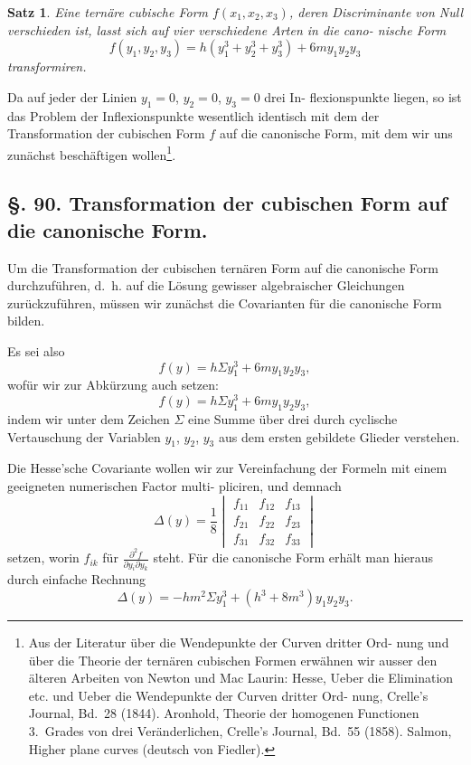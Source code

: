 \documentclass[12pt,a4paper]{article}
\theoremstyle{plain}
\newtheorem{satz}{Satz}[section]
\theoremstyle{definition}
\theoremstyle{remark}
\begin{document}
\begin{satz}
Eine ternäre cubische Form $f(x_1, x_2, x_3)$, deren
Discriminante von Null verschieden ist, lasst
sich auf vier verschiedene Arten in die cano-
nische Form
\[f(y_1, y_2, y_3) = h(y_1^3 + y_2^3 + y_3^3) + 6m y_1 y_2 y_3\]
transformiren.
\end{satz}

Da auf jeder der Linien $y_1 = 0$, $y_2 = 0$, $y_3 = 0$ drei In-
flexionspunkte liegen, so ist das Problem der Inflexionspunkte
wesentlich identisch mit dem der Transformation der cubischen
Form $f$ auf die canonische Form, mit dem wir uns zunächst
beschäftigen wollen\footnote{Aus der Literatur über die Wendepunkte der Curven dritter Ord-
nung und über die Theorie der ternären cubischen Formen erwähnen wir
ausser den älteren Arbeiten von Newton und Mac Laurin: Hesse, \glqq{}Ueber
die Elimination etc.\grqq{} und \glqq{}Ueber die Wendepunkte der Curven dritter Ord-
nung\grqq{}, Crelle's Journal, Bd.~28 (1844). Aronhold, Theorie der homogenen
Functionen 3.~Grades von drei Veränderlichen, Crelle's Journal, Bd.~55 (1858).
Salmon, Higher plane curves (deutsch von Fiedler).}.

\subsection*{§. 90. Transformation der cubischen Form auf die canonische Form.}

Um die Transformation der cubischen ternären Form auf
die canonische Form durchzuführen, d.~h. auf die Lösung gewisser
algebraischer Gleichungen zurückzuführen, müssen wir zunächst
die Covarianten für die canonische Form bilden.

Es sei also
\begin{equation}\label{eq:90_1}
f(y) = h\Sigma y_1^3 + 6m y_1 y_2 y_3,
\end{equation}
wofür wir zur Abkürzung auch setzen:
\begin{equation}\label{eq:90_2}
f(y) = h\Sigma y_1^3 + 6m y_1 y_2 y_3,
\end{equation}
indem wir unter dem Zeichen $\Sigma$ eine Summe über drei durch
cyclische Vertauschung der Variablen $y_1$, $y_2$, $y_3$ aus dem ersten
gebildete Glieder verstehen.

Die Hesse'sche Covariante wollen wir zur Vereinfachung
der Formeln mit einem geeigneten numerischen Factor multi-
pliciren, und demnach
\begin{equation}\label{eq:90_3}
\Delta(y) = \frac{1}{8}\begin{vmatrix}
f_{11} & f_{12} & f_{13} \\
f_{21} & f_{22} & f_{23} \\
f_{31} & f_{32} & f_{33}
\end{vmatrix}
\end{equation}
setzen, worin $f_{ik}$ für $\frac{\partial^2 f}{\partial y_i \partial y_k}$ steht. Für die canonische Form
erhält man hieraus durch einfache Rechnung
\begin{equation}\label{eq:90_4}
\Delta(y) = -hm^2 \Sigma y_1^3 + (h^3 + 8m^3) y_1 y_2 y_3.
\end{equation}
\end{document}
